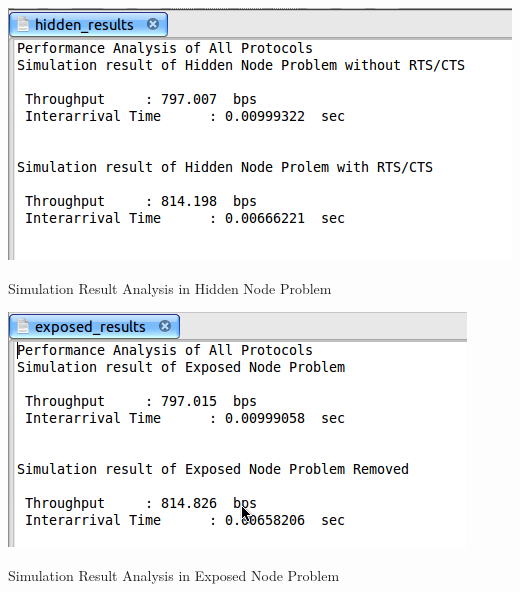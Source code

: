 \documentclass[a4paper,12pt]{report}
\begin{document}
\begin{center}

 \includegraphics[width=15 cm,height=13 cm]{./hidden.png}

Simulation Result  Analysis in Hidden Node Problem
\end{center}
\begin{center}

 \includegraphics[width=15 cm,height=13 cm]{./exposed.png}

Simulation Result  Analysis in Exposed Node Problem
\end{center}
\end{document}
